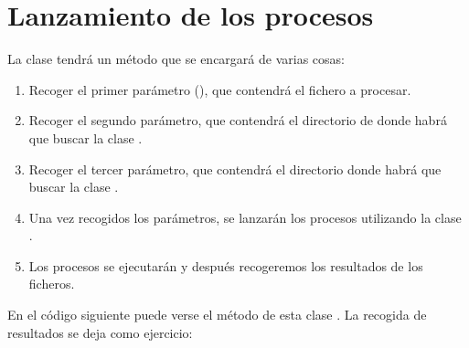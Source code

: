 \documentclass[letterpaper,10pt,spanish]{sphinxmanual}
\begin{document}
\section{Lanzamiento de los procesos}
\label{\detokenize{textos/tema1:lanzamiento-de-los-procesos}}
La clase  tendrá un método  que se encargará de varias cosas:
\begin{enumerate}
\def\theenumi{\arabic{enumi}}
\def\labelenumi{\theenumi .}
\makeatletter\def\p@enumii{\p@enumi \theenumi .}\makeatother
\item {} 
Recoger el primer parámetro (), que contendrá el fichero a procesar.

\item {} 
Recoger el segundo parámetro, que contendrá el directorio de  donde habrá que buscar la clase .

\item {} 
Recoger el tercer parámetro, que contendrá el directorio donde habrá que buscar la clase .

\item {} 
Una vez recogidos los parámetros, se lanzarán los procesos utilizando la clase .

\item {} 
Los procesos se ejecutarán y después recogeremos los resultados de los ficheros.

\end{enumerate}

En el código siguiente puede verse el método  de esta clase . La recogida de resultados se deja como ejercicio:
\end{document}

